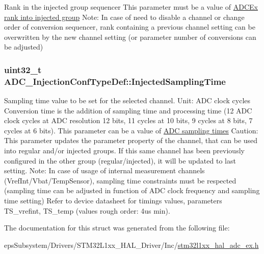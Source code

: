 Rank in the injected group sequencer This parameter must be a value of \hyperlink{group___a_d_c_ex__injected__rank}{A\-D\-C\-Ex rank into injected group} Note\-: In case of need to disable a channel or change order of conversion sequencer, rank containing a previous channel setting can be overwritten by the new channel setting (or parameter number of conversions can be adjusted) \hypertarget{struct_a_d_c___injection_conf_type_def_a3d15c0590dbafc9e99e21ea4df5b0c6b}{
\subsubsection[{Injected\-Sampling\-Time}]{\setlength{\rightskip}{0pt plus 5cm}uint32\-\_\-t A\-D\-C\-\_\-\-Injection\-Conf\-Type\-Def\-::\-Injected\-Sampling\-Time}}\label{struct_a_d_c___injection_conf_type_def_a3d15c0590dbafc9e99e21ea4df5b0c6b}
Sampling time value to be set for the selected channel. Unit\-: A\-D\-C clock cycles Conversion time is the addition of sampling time and processing time (12 A\-D\-C clock cycles at A\-D\-C resolution 12 bits, 11 cycles at 10 bits, 9 cycles at 8 bits, 7 cycles at 6 bits). This parameter can be a value of \hyperlink{group___a_d_c__sampling__times}{A\-D\-C sampling times} Caution\-: This parameter updates the parameter property of the channel, that can be used into regular and/or injected groups. If this same channel has been previously configured in the other group (regular/injected), it will be updated to last setting. Note\-: In case of usage of internal measurement channels (Vref\-Int/\-Vbat/\-Temp\-Sensor), sampling time constraints must be respected (sampling time can be adjusted in function of A\-D\-C clock frequency and sampling time setting) Refer to device datasheet for timings values, parameters T\-S\-\_\-vrefint, T\-S\-\_\-temp (values rough order\-: 4us min). 

The documentation for this struct was generated from the following file\-:\begin{DoxyCompactItemize}
\item 
eps\-Subsystem/\-Drivers/\-S\-T\-M32\-L1xx\-\_\-\-H\-A\-L\-\_\-\-Driver/\-Inc/\hyperlink{stm32l1xx__hal__adc__ex_8h}{stm32l1xx\-\_\-hal\-\_\-adc\-\_\-ex.\-h}\end{DoxyCompactItemize}
